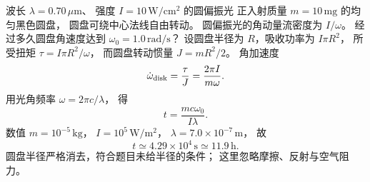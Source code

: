 波长 $\lambda=0.70\,\mu\mathrm m$、
强度 $I=10\,\mathrm{W/cm^2}$ 的圆偏振光
正入射质量 $m=10\,\mathrm{mg}$ 的均匀黑色圆盘，
圆盘可绕中心法线自由转动。
圆偏振光的角动量流密度为 $I/\omega$。
经过多久圆盘角速度达到
$\omega_0=1.0\,\mathrm{rad/s}$？
\exsolution
设圆盘半径为 $R$，吸收功率为 $I\pi R^2$，
所受扭矩
$\tau=I\pi R^2/\omega$，
而圆盘转动惯量 $J=mR^2/2$。
角加速度
\[
 \dot\omega_{\rm disk}
 =\frac{\tau}{J}
 =\frac{2\pi I}{m\omega}.
\]
用光角频率 $\omega=2\pi c/\lambda$，
得
\[
 \boxed{t=\frac{m c\omega_0}{I\lambda}}.
\]
数值 $m=10^{-5}\,\mathrm{kg}$，
$I=10^5\,\mathrm{W/m^2}$，
$\lambda=7.0\times10^{-7}\,\mathrm m$，
故
\[
 \boxed{t\simeq4.29\times10^4\,\mathrm s
 \simeq11.9\,\mathrm h}.
\]
\excheck 圆盘半径严格消去，符合题目未给半径的条件；
这里忽略摩擦、反射与空气阻力。
